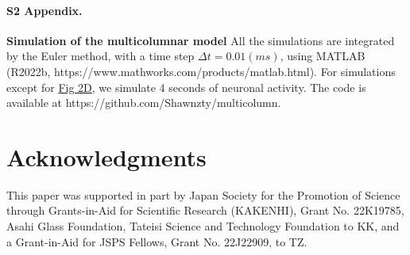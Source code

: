 \documentclass[10pt,letterpaper]{article}
\begin{document}
\paragraph*{S2 Appendix.}
\label{S2_Appendix}
{\bf Simulation of the multicolumnar model} All the simulations are integrated by the Euler method, with a time step $\Delta t=0.01 (ms)$, using MATLAB (R2022b, https://www.mathworks.com/products/matlab.html). For simulations except for \hyperlink{fig:fig2}{Fig 2D}, we simulate 4 seconds of neuronal activity. The code is available at https://github.com/Shawnzty/multicolumn.

\section*{Acknowledgments}
This paper was supported in part by Japan Society for the Promotion of Science through Grants-in-Aid for Scientific Research (KAKENHI), Grant No. 22K19785, Asahi Glass Foundation, Tateisi Science and Technology
Foundation to KK, and a Grant-in-Aid for JSPS Fellows, Grant No. 22J22909, to TZ.


%
%
% 
\end{document}
